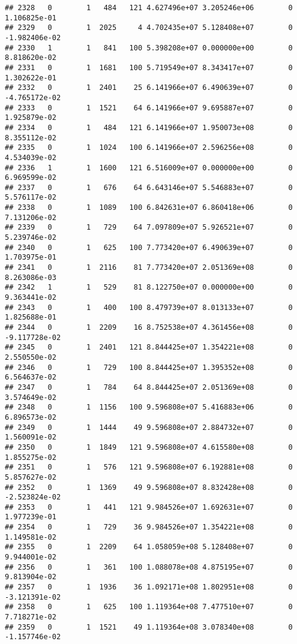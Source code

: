 \documentclass[
]{article}
\begin{document}
\begin{enumerate}
\begin{verbatim}
## 2328   0        1   484   121 4.627496e+07 3.205246e+06        0  1.106825e-01
## 2329   0        1  2025     4 4.702435e+07 5.128408e+07        0 -1.982406e-02
## 2330   1        1   841   100 5.398208e+07 0.000000e+00        0  8.818620e-02
## 2331   0        1  1681   100 5.719549e+07 8.343417e+07        0  1.302622e-01
## 2332   0        1  2401    25 6.141966e+07 6.490639e+07        0 -4.765172e-02
## 2333   0        1  1521    64 6.141966e+07 9.695887e+07        0  1.925879e-02
## 2334   0        1   484   121 6.141966e+07 1.950073e+08        0  8.355112e-02
## 2335   0        1  1024   100 6.141966e+07 2.596256e+08        0  4.534039e-02
## 2336   1        1  1600   121 6.516009e+07 0.000000e+00        0  6.969599e-02
## 2337   0        1   676    64 6.643146e+07 5.546883e+07        0  5.576117e-02
## 2338   0        1  1089   100 6.842631e+07 6.860418e+06        0  7.131206e-02
## 2339   0        1   729    64 7.097809e+07 5.926521e+07        0  5.239746e-02
## 2340   0        1   625   100 7.773420e+07 6.490639e+07        0  1.703975e-01
## 2341   0        1  2116    81 7.773420e+07 2.051369e+08        0  8.263086e-03
## 2342   1        1   529    81 8.122750e+07 0.000000e+00        0  9.363441e-02
## 2343   0        1   400   100 8.479739e+07 8.013133e+07        0  1.825688e-01
## 2344   0        1  2209    16 8.752538e+07 4.361456e+08        0 -9.117728e-02
## 2345   0        1  2401   121 8.844425e+07 1.354221e+08        0  2.550550e-02
## 2346   0        1   729   100 8.844425e+07 1.395352e+08        0  6.564637e-02
## 2347   0        1   784    64 8.844425e+07 2.051369e+08        0  3.574649e-02
## 2348   0        1  1156   100 9.596808e+07 5.416883e+06        0  6.896573e-02
## 2349   0        1  1444    49 9.596808e+07 2.884732e+07        0  1.560091e-02
## 2350   0        1  1849   121 9.596808e+07 4.615580e+08        0  1.855275e-02
## 2351   0        1   576   121 9.596808e+07 6.192881e+08        0  5.857627e-02
## 2352   0        1  1369    49 9.596808e+07 8.832428e+08        0 -2.523824e-02
## 2353   0        1   441   121 9.984526e+07 1.692631e+07        0  1.977239e-01
## 2354   0        1   729    36 9.984526e+07 1.354221e+08        0  1.149581e-02
## 2355   0        1  2209    64 1.058059e+08 5.128408e+07        0  9.944001e-02
## 2356   0        1   361   100 1.088078e+08 4.875195e+07        0  9.813904e-02
## 2357   0        1  1936    36 1.092171e+08 1.802951e+08        0 -3.121391e-02
## 2358   0        1   625   100 1.119364e+08 7.477510e+07        0  7.718271e-02
## 2359   0        1  1521    49 1.119364e+08 3.078340e+08        0 -1.157746e-02

\end{verbatim}
\end{enumerate}
\end{document}
